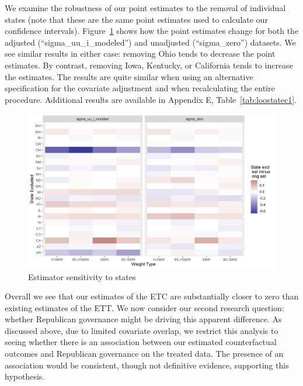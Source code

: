 \documentclass[aoas]{imsart}
\theoremstyle{plain}
\theoremstyle{remark}
\begin{document}
We examine the robustness of our point estimates to the removal of individual states (note that these are the same point estimates used to calculate our confidence intervals). Figure~\ref{fig:loostateplot} shows how the point estimates change for both the adjusted (``sigma\_uu\_i\_modeled'') and unadjusted (``sigma\_zero'') datasets. We see similar results in either case: removing Ohio tends to decrease the point estimates. By contrast, removing Iowa, Kentucky, or California tends to increase the estimates. The results are quite similar when using an alternative specification for the covariate adjustment and when recalculating the entire procedure. Additional results are available in Appendix E, Table~\ref{tab:loostatec1}. 

\begin{figure}[H]
\begin{center}
    \caption{Estimator sensitivity to states}
    \label{fig:loostateplot}
    \includegraphics[scale=0.6]{01_Plots/loostate-sensitivityc1-state-uu-i.png}
\end{center}
\end{figure}

Overall we see that our estimates of the ETC are substantially closer to zero than existing estimates of the ETT. We now consider our second research question: whether Republican governance might be driving this apparent difference. As discussed above, due to limited covariate overlap, we restrict this analysis to seeing whether there is an association between our estimated counterfactual outcomes and Republican governance on the treated data. The presence of an association would be consistent, though not definitive evidence, supporting this hypothesis.
\end{document}
